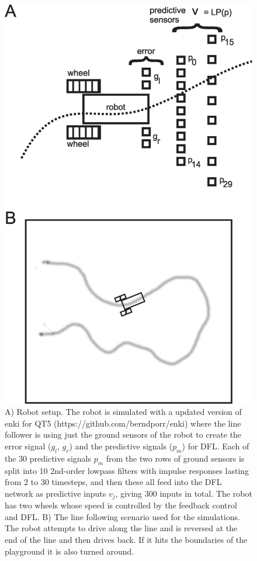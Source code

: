 \documentclass{aamas2018}
\begin{document}
\begin{figure}[!ht]
  \centering
  \includegraphics[width=\columnwidth]{linefollower_robot_playground}
  \caption{A) Robot setup. The robot is simulated with a updated
    version of enki for QT5 (https://github.com/berndporr/enki)
    where the line follower is using just the ground sensors of the
    robot to create the error signal ($g_l$, $g_r$) and the predictive signals ($p_m$)
    for DFL. Each of the 30 predictive signals $p_m$ from the two rows of ground sensors
    is split into 10 2nd-order lowpass filters with impulse responses
    lasting from $2$ to $30$ timesteps, and then these all feed into the DFL
    network as predictive inputs $v_j$, giving 300 inputs in total.
    The robot has two wheels whose speed is controlled
    by the feedback control and DFL.
    B) The line following scenario used for the simulations. The robot
    attempts to drive along the line and is reversed at the end of the
    line and then drives back. If it hits the boundaries of the playground
    it is also turned around.
    \label{linefollower_robot_playground}}
\end{figure}
\end{document}
